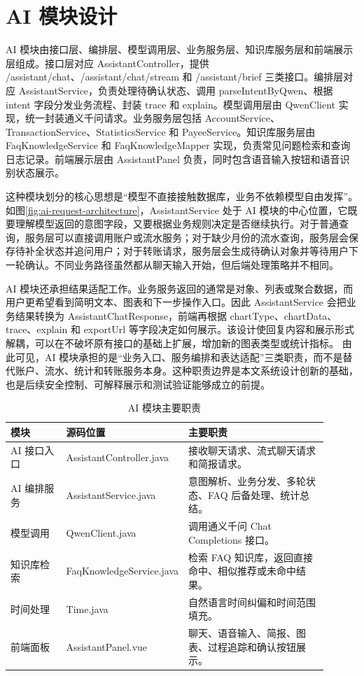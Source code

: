 \documentclass[bachelor, print]{xduthesis}
\begin{document}
\section{AI 模块设计}

AI 模块由接口层、编排层、模型调用层、业务服务层、知识库服务层和前端展示层组成。接口层对应 AssistantController，提供 /assistant/chat、/assistant/chat/stream 和 /assistant/brief 三类接口。编排层对应 AssistantService，负责处理待确认状态、调用 parseIntentByQwen、根据 intent 字段分发业务流程、封装 trace 和 explain。模型调用层由 QwenClient 实现，统一封装通义千问请求。业务服务层包括 AccountService、TransactionService、StatisticsService 和 PayeeService。知识库服务层由 FaqKnowledgeService 和 FaqKnowledgeMapper 实现，负责常见问题检索和查询日志记录。前端展示层由 AssistantPanel 负责，同时包含语音输入按钮和语音识别状态展示。

这种模块划分的核心思想是“模型不直接接触数据库，业务不依赖模型自由发挥”。如图\ref{fig:ai-request-architecture}，AssistantService 处于 AI 模块的中心位置，它既要理解模型返回的意图字段，又要根据业务规则决定是否继续执行。对于普通查询，服务层可以直接调用账户或流水服务；对于缺少月份的流水查询，服务层会保存待补全状态并追问用户；对于转账请求，服务层会生成待确认对象并等待用户下一轮确认。不同业务路径虽然都从聊天输入开始，但后端处理策略并不相同。

AI 模块还承担结果适配工作。业务服务返回的通常是对象、列表或聚合数据，而用户更希望看到简明文本、图表和下一步操作入口。因此 AssistantService 会把业务结果转换为 AssistantChatResponse，前端再根据 chartType、chartData、trace、explain 和 exportUrl 等字段决定如何展示。该设计使回复内容和展示形式解耦，可以在不破坏原有接口的基础上扩展，增加新的图表类型或统计指标。
由此可见，AI 模块承担的是“业务入口、服务编排和表达适配”三类职责，而不是替代账户、流水、统计和转账服务本身。这种职责边界是本文系统设计创新的基础，也是后续安全控制、可解释展示和测试验证能够成立的前提。

\begin{table}[H]
    \centering
    \caption{AI 模块主要职责}
    \label{tab:ai-module-source}
    \begin{tabular}{|p{0.18\linewidth}|p{0.27\linewidth}|p{0.45\linewidth}|}
        \hline
        模块 & 源码位置 & 主要职责 \\
        \hline
        AI 接口入口 & AssistantController.java & 接收聊天请求、流式聊天请求和简报请求。 \\
        \hline
        AI 编排服务 & AssistantService.java & 意图解析、业务分发、多轮状态、FAQ 后备处理、统计总结。 \\
        \hline
        模型调用 & QwenClient.java & 调用通义千问 Chat Completions 接口。 \\
        \hline
        知识库检索 & FaqKnowledgeService.java & 检索 FAQ 知识库，返回直接命中、相似推荐或未命中结果。 \\
        \hline
        时间处理 & Time.java & 自然语言时间纠偏和时间范围填充。 \\
        \hline
        前端面板 & AssistantPanel.vue & 聊天、语音输入、简报、图表、过程追踪和确认按钮展示。 \\
        \hline
    \end{tabular}
\end{table}
\end{document}
